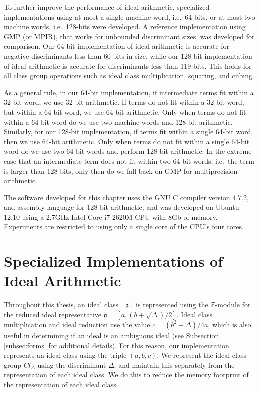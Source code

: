 \documentclass{ucalgthes1}
\theoremstyle{definition}
\newcommand{\ZZ}{\mathbb{Z}}
\newcommand{\compiler}{GNU C compiler version 4.7.2}
\newcommand{\cpu}{2.7GHz Intel Core i7-2620M CPU}
\begin{document}
To further improve the performance of ideal arithmetic, specialized implementations using at most a single machine word, i.e.\ 64-bits, or at most two machine words, i.e.\ 128-bits were developed.  A reference implementation using GMP (or MPIR), that works for unbounded discriminant sizes, was developed for comparison.  Our 64-bit implementation of ideal arithmetic is accurate for negative discriminants less than 60-bits in size, while our 128-bit implementation of ideal arithmetic is accurate for discriminants less than 119-bits.  This holds for all class group operations such as ideal class multiplication, squaring, and cubing.

As a general rule, in our 64-bit implementation, if intermediate terms fit within a 32-bit word, we use 32-bit arithmetic.  If terms do not fit within a 32-bit word, but within a 64-bit word, we use 64-bit arithmetic.  Only when terms do not fit within a 64-bit word do we use two machine words and 128-bit arithmetic.  Similarly, for our 128-bit implementation, if terms fit within a single 64-bit word, then we use 64-bit arithmetic.  Only when terms do not fit within a single 64-bit word do we use two 64-bit words and perform 128-bit arithmetic.  In the extreme case that an intermediate term does not fit within two 64-bit words, i.e.\ the term is larger than 128-bits, only then do we fall back on GMP for multiprecision arithmetic.

The software developed for this chapter uses the \compiler{}, and assembly language for 128-bit arithmetic, and was developed on Ubuntu 12.10 using a \cpu{} with 8Gb of memory.  Experiments are restricted to using only a single core of the CPU's four cores.

\section{Specialized Implementations of Ideal Arithmetic}
\label{sec:implementationOfIdealArithmetic}


Throughout this thesis, an ideal class $[\mathfrak a]$ is represented using the $\ZZ$-module for the reduced ideal representative $\mathfrak a = [a, (b + \sqrt{\Delta})/2]$.  Ideal class multiplication and ideal reduction use the value $c = (b^2 - \Delta)/4a$, which is also useful in determining if an ideal is an ambiguous ideal (see Subsection \ref{subsec:forms} for additional details).  For this reason, our implementation represents an ideal class using the triple $(a, b, c)$.  We represent the ideal class group $Cl_\Delta$ using the discriminant $\Delta$, and maintain this separately from the representation of each ideal class.  We do this to reduce the memory footprint of the representation of each ideal class.
\end{document}

